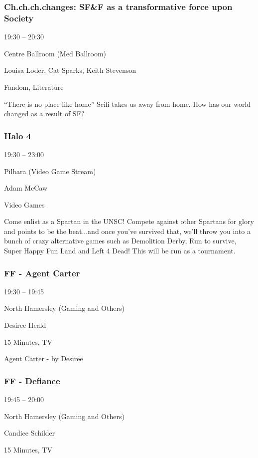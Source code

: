\documentclass{scrreprt}
\begin{document}
\begin{multicols}{2}
\subsubsection*{Ch.ch.ch.changes: SF\&F as a transformative force upon Society}\begin{description}
\setlength{\itemsep}{0pt}
\setlength{\parsep}{0pt}
\setlength{\parskip}{0pt}
\item[Time:]{19:30 -- 20:30}
\item[Venue:]{Centre Ballroom (Med Ballroom)}
\item[People:]{Louisa Loder, Cat Sparks, Keith Stevenson}
\item[Tags:]{Fandom, Literature}\end{description}
“There is no place like home” Scifi takes us away from home. How has our world changed as a result of SF?
\subsubsection*{Halo 4}\begin{description}
\setlength{\itemsep}{0pt}
\setlength{\parsep}{0pt}
\setlength{\parskip}{0pt}
\item[Time:]{19:30 -- 23:00}
\item[Venue:]{Pilbara (Video Game Stream)}
\item[People:]{Adam McCaw}
\item[Tags:]{Video Games}\end{description}
Come enlist as a Spartan in the UNSC! Compete against other Spartans for glory and points to be the beat...and once you've survived that, we'll throw you into a bunch of crazy alternative games such as Demolition Derby, Run to survive, Super Happy Fun Land and Left 4 Dead! This will be run as a tournament.
\subsubsection*{FF  - Agent Carter}\begin{description}
\setlength{\itemsep}{0pt}
\setlength{\parsep}{0pt}
\setlength{\parskip}{0pt}
\item[Time:]{19:30 -- 19:45}
\item[Venue:]{North Hamersley (Gaming and Others)}
\item[People:]{Desiree Heald}
\item[Tags:]{15 Minutes, TV}\end{description}
Agent Carter - by Desiree
\subsubsection*{FF - Defiance}\begin{description}
\setlength{\itemsep}{0pt}
\setlength{\parsep}{0pt}
\setlength{\parskip}{0pt}
\item[Time:]{19:45 -- 20:00}
\item[Venue:]{North Hamersley (Gaming and Others)}
\item[People:]{Candice Schilder}
\item[Tags:]{15 Minutes, TV}\end{description}


\end{multicols}
\end{document}
